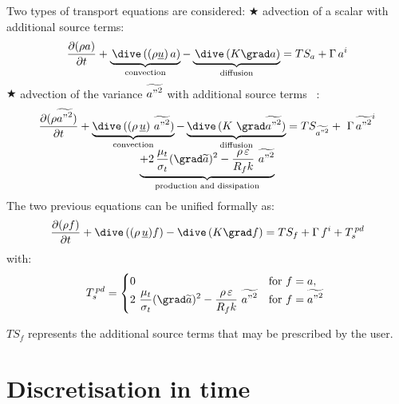 Two types of transport equations are considered: \newline
{\tiny $\bigstar $} advection of a scalar with additional source terms:
\begin{equation}
\frac{\partial (\rho a)}{\partial t}+\underbrace{\,\dive\,((\rho \underline{u%
})\,a)}_{\text{convection}}-\underbrace{\,\dive\,(K\grad a)}_{\text{diffusion%
}}=TS_{a}+\Gamma \,a^{i}
\end{equation}%
{\tiny $\bigstar $} advection of the variance $\widetilde{{a"}^{2}}$ with
additional source terms ~:
\begin{equation}
\begin{array}{lcl}
& \displaystyle\frac{\partial (\rho \widetilde{{a"}^{2}})}{\partial t}+%
\underbrace{\dive\,((\rho \,\underline{u})\ \widetilde{{a"}^{2}})}_{\text{%
convection}}-\underbrace{\dive\,(K\ \grad\widetilde{{a"}^{2}})}_{\text{%
diffusion}}=TS_{\widetilde{{a"}^{2}}}+\ \Gamma \,\widetilde{{a"}^{2}}^{i} &
\\
& \displaystyle\underbrace{+2\,\frac{\mu _{t}}{\sigma _{t}}(\grad\widetilde{a%
})^{2}-\frac{\rho \,\varepsilon }{R_{f}k}\ \widetilde{{a"}^{2}}}_{\text{%
production and dissipation}} &
\end{array}%
\end{equation}%
The two previous equations can be unified formally as:
\begin{equation}
\frac{\partial (\rho f)}{\partial t}+\dive\,((\rho \,\underline{u})f)-\dive%
\,(K\grad f)=TS_{f}+\Gamma \,f^{i}+T_{s}^{\,pd}  \label{Base_Introd_depart}
\end{equation}%
with:
\begin{equation}
\begin{array}{lll}
& \displaystyle T_{s}^{\,pd}=\begin{cases} 0 & \text{for $f=a$}, \\ 2\
\displaystyle \frac{\mu_t}{\sigma_t}(\grad \widetilde{a})^2 - \displaystyle
\frac{\rho\,\varepsilon}{R_f k}\ \widetilde{{a"}^2} & \text{for
$f=\widetilde{{a"}^2}$ } \end{cases} &
\end{array}%
\end{equation}

$TS_f$ represents the additional source terms that may be prescribed by the
user.

\newpage %

\section{Discretisation in time}

